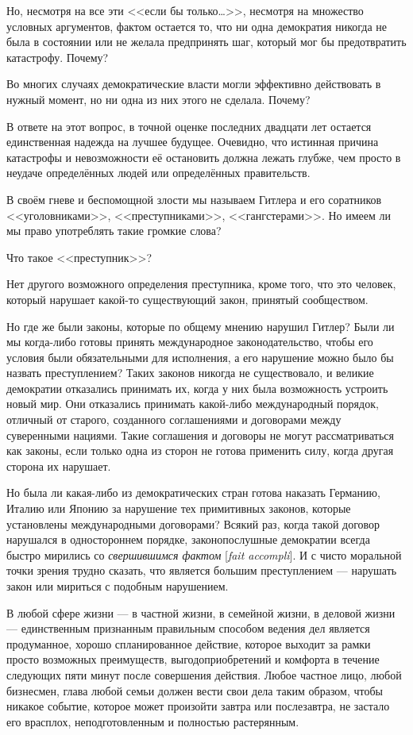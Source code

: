 Но, несмотря на все эти <<если бы только\ldots>>, несмотря на множество условных аргументов, фактом остается то, что ни одна демократия никогда не была в состоянии или не желала предпринять шаг, который мог бы предотвратить катастрофу. Почему?

Во многих случаях демократические власти могли эффективно действовать в нужный момент, но ни одна из них этого не сделала. Почему?

В ответе на этот вопрос, в точной оценке последних двадцати лет остается единственная надежда на лучшее будущее. Очевидно, что истинная причина катастрофы и невозможности её остановить должна лежать глубже, чем просто в неудаче определённых людей или определённых правительств.

В своём гневе и беспомощной злости мы называем Гитлера и его соратников <<уголовниками>>, <<преступниками>>, <<гангстерами>>. Но имеем ли мы право употреблять такие громкие слова?

Что такое <<преступник>>?

Нет другого возможного определения преступника, кроме того, что это человек, который нарушает какой-то существующий закон, принятый сообществом.

Но где же были законы, которые по общему мнению нарушил Гитлер? Были ли мы когда-либо готовы принять международное законодательство, чтобы его условия были обязательными для исполнения, а его нарушение можно было бы назвать преступлением? Таких законов никогда не существовало, и великие демократии отказались принимать их, когда у них была возможность устроить новый мир. Они отказались принимать какой-либо международный порядок, отличный от старого, созданного соглашениями и договорами между суверенными нациями. Такие соглашения и договоры не могут рассматриваться как законы, если только одна из сторон не готова применить силу, когда другая сторона их нарушает.

Но была ли какая-либо из демократических стран готова наказать Германию, Италию или Японию за нарушение тех примитивных законов, которые установлены международными договорами? Всякий раз, когда такой договор нарушался в одностороннем порядке, законопослушные демократии всегда быстро мирились со \textit{свершившимся фактом} [\textit{fait accompli}]. И с чисто моральной точки зрения трудно сказать, что является большим преступлением — нарушать закон или мириться с подобным нарушением.

В любой сфере жизни — в частной жизни, в семейной жизни, в деловой жизни — единственным признанным правильным способом ведения дел является продуманное, хорошо спланированное действие, которое выходит за рамки просто возможных преимуществ, выгодоприобретений и комфорта в течение следующих пяти минут после совершения действия. Любое частное лицо, любой бизнесмен, глава любой семьи должен вести свои дела таким образом, чтобы никакое событие, которое может произойти завтра или послезавтра, не застало его врасплох, неподготовленным и полностью растерянным.

